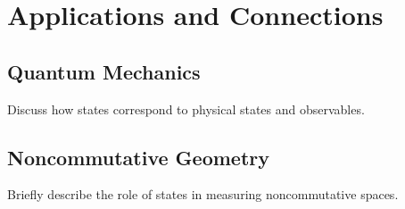 \section{Applications and Connections}
\subsection{Quantum Mechanics}
Discuss how states correspond to physical states and observables.

\subsection{Noncommutative Geometry}
Briefly describe the role of states in measuring noncommutative spaces.